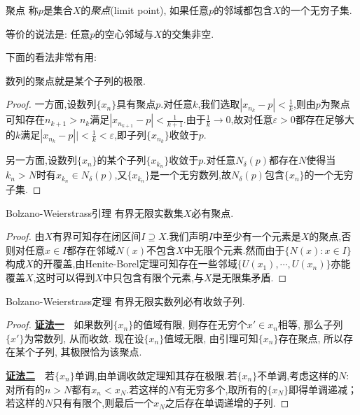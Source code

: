 \begin{definition}{聚点}
	称$p$是集合$X$的\textit{聚点}(limit point), 如果任意$p$的邻域都包含$X$的一个无穷子集.
\end{definition}
\begin{remark}
	等价的说法是: 任意$p$的空心邻域与$X$的交集非空. 
\end{remark}

下面的看法非常有用:

\begin{proposition}{}
	数列的聚点就是某个子列的极限.
\end{proposition}
\begin{proof}
	一方面,设数列$\{ x_n \}$具有聚点$p$.对任意$k$,我们选取$|x_{n_k}-p|<\frac{1}{k}$,则由$p$为聚点可知存在$n_{k+1}>n_k$满足$|x_{n_{k+1}}-p|<\frac{1}{k+1}$.由于$\frac{1}{k} \to 0$,故对任意$\varepsilon >0$都存在足够大的$k$满足$|x_{n_k}-p||<\frac{1}{k}<\varepsilon$,即子列$\{ x_{n_k} \}$收敛于$p$.
	
	另一方面,设数列$\{ x_n \}$的某个子列$\{ x_{k_n} \}$收敛于$p$.对任意$N_{\delta}(p)$都存在$N$使得当$k_n>N$时有$x_{k_n} \in N_{\delta}(p)$,又$\{ x_{k_n} \}$是一个无穷数列,故$N_{\delta}(p)$包含$\{ x_n \}$的一个无穷子集.
\end{proof}

\begin{lemma}{Bolzano-Weierstrass引理}
	有界无限实数集$X$必有聚点.
\end{lemma}
\begin{proof}
	由$X$有界可知存在闭区间$I \supseteq X$.我们声明$I$中至少有一个元素是$X$的聚点,否则对任意$x \in I$都存在邻域$N(x)$不包含$X$中无限个元素.然而由于$\{ N(x):x \in I \}$构成$X$的开覆盖,由Henite-Borel定理可知存在一些邻域$\{ U(x_1),\cdots ,U(x_n) \}$亦能覆盖$X$,这时可以得到$X$中只包含有限个元素,与$X$是无限集矛盾.
\end{proof}

\begin{theorem}{Bolzano-Weierstrass定理}
	有界无限实数列必有收敛子列.
\end{theorem}
\begin{proof}
	\underline{\textbf{证法一}}~~如果数列$\{ x_n \}$的值域有限, 则存在无穷个$x' \in x_n$相等, 那么子列$\{ x' \}$为常数列, 从而收敛. 现在设$\{ x_n \}$值域无限, 由引理可知$\{ x_n \}$存在聚点, 所以存在某个子列, 其极限恰为该聚点.
	
	\underline{\textbf{证法二}}~~若$\{ x_n \}$单调,由单调收敛定理知其存在极限.若$\{ x_n \}$不单调,考虑这样的$N$:对所有的$n>N$都有$x_n<x_N$.若这样的$N$有无穷多个,取所有的$\{ x_N \}$即得单调递减；若这样的$N$只有有限个,则最后一个$x_N$之后存在单调递增的子列.
\end{proof}

